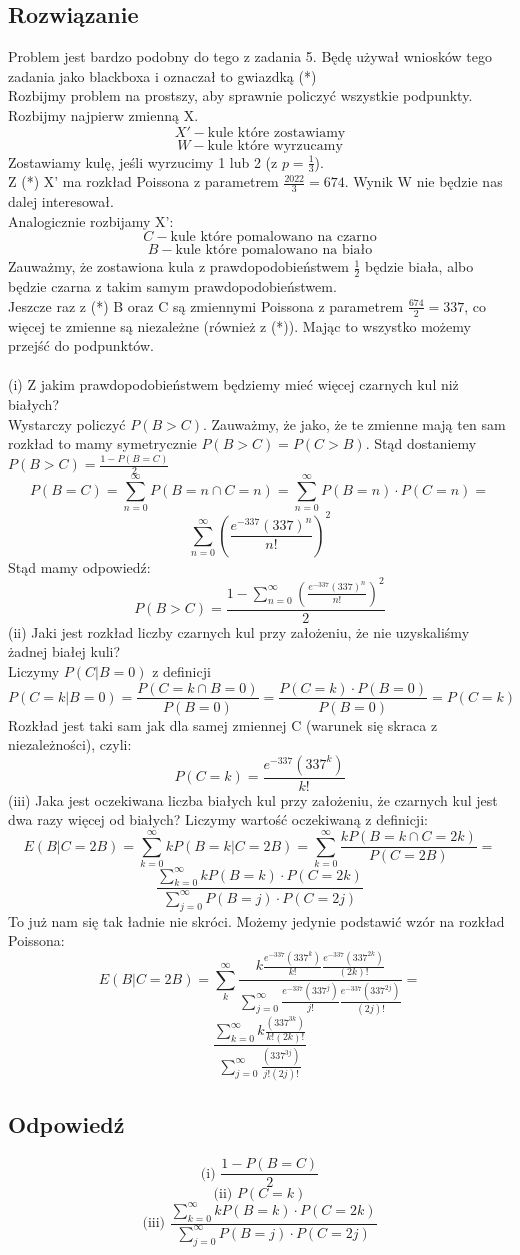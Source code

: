 \subsection*{Rozwiązanie}
Problem jest bardzo podobny do tego z zadania 5. Będę używał wniosków tego zadania jako blackboxa i oznaczał to gwiazdką (*)\\
Rozbijmy problem na prostszy, aby sprawnie policzyć wszystkie podpunkty. Rozbijmy najpierw zmienną X.\\
\[X' -\text{kule które zostawiamy}\]
\[W - \text{kule które wyrzucamy}\]
Zostawiamy kulę, jeśli wyrzucimy 1 lub 2 (z \(p=\frac{1}{3}\)).\\
Z (*) X' ma rozkład Poissona z parametrem \(\frac{2022}{3}=674\).
Wynik W nie będzie nas dalej interesował.\\
Analogicznie rozbijamy X':
\[C -\text{kule które pomalowano na czarno}\]
\[B - \text{kule które pomalowano na biało}\]
Zauważmy, że zostawiona kula z prawdopodobieństwem \(\frac{1}{2}\) będzie biała, albo będzie czarna z takim samym prawdopodobieństwem.\\
Jeszcze raz z (*) B oraz C są zmiennymi Poissona z parametrem \(\frac{674}{2}=337\), co więcej te zmienne są niezależne (również z (*)).
Mając to wszystko możemy przejść do podpunktów.\\\\
(i)  Z jakim prawdopodobieństwem będziemy mieć więcej czarnych kul niż białych?\\
Wystarczy policzyć \(P(B>C)\). Zauważmy, że jako, że te zmienne mają ten sam rozkład to mamy symetrycznie \(P(B>C)=P(C>B)\). Stąd dostaniemy \(P(B>C)=\frac{1-P(B=C)}{2}\)
\[P(B=C)=\sum_{n=0}^\infty P(B=n \cap C=n) = \sum_{n=0}^\infty P(B=n) \cdot P(C=n)=\]
\[\sum_{n=0}^\infty \left(\frac{e^{-337}(337)^n}{n!}\right)^2\]
Stąd mamy odpowiedź:
\[P(B>C)=\frac{1-\sum_{n=0}^\infty \left(\frac{e^{-337}(337)^n}{n!}\right)^2}{2}\]
(ii) Jaki jest rozkład liczby czarnych kul przy założeniu, że nie uzyskaliśmy żadnej białej kuli?\\
Liczymy \(P(C|B=0)\) z definicji
\[P(C=k|B=0)=\frac{P(C=k \cap B=0)}{P(B=0)} = \frac{P(C=k) \cdot P( B=0)}{P(B=0)} = P(C=k)\]
Rozkład jest taki sam jak dla samej zmiennej C (warunek się skraca z niezależności), czyli:
\[P(C=k)=\frac{e^{-337}(337^k)}{k!}\]
(iii) Jaka jest oczekiwana liczba białych kul przy założeniu, że czarnych kul jest dwa razy więcej od białych?
Liczymy wartość oczekiwaną z definicji:
\[E(B|C=2B) = \sum_{k=0}^\infty kP(B=k|C=2B)=\sum_{k=0}^\infty \frac{kP(B=k\cap C=2k)}{P(C=2B)} =\]
\[ \frac{ \sum_{k=0}^\infty k P(B=k)\cdot P(C=2k)}{\sum_{j=0}^\infty P(B=j)\cdot P(C=2j)}\]
To już nam się tak ładnie nie skróci. Możemy jedynie podstawić wzór na rozkład Poissona:
\[E(B|C=2B) = \sum_{k}^\infty \frac{k \frac{e^{-337}(337^k)}{k!} \frac{e^{-337}(337^{2k})}{(2k)!}}{\sum_{j=0}^\infty \frac{e^{-337}(337^j)}{j!} \frac{e^{-337}(337^{2j})}{(2j)!}} = \]
\[ \frac{ \sum_{k=0}^\infty k \frac{(337^{3k})}{k!(2k)!}}{\sum_{j=0}^\infty \frac{(337^{3j})}{j!(2j)!}} \]
\subsection*{Odpowiedź}
\[\text{(i) } \frac{1-P(B=C)}{2}\]
\[\text{(ii) } P(C=k)\]
\[\text{(iii) }  \frac{ \sum_{k=0}^\infty k P(B=k)\cdot P(C=2k)}{\sum_{j=0}^\infty P(B=j)\cdot P(C=2j)}\]
